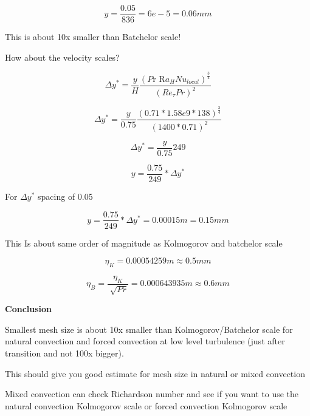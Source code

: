 \documentclass[12pt]{article}
\renewcommand{\_}{\kern-1.5pt\textunderscore\kern-1.5pt}
\begin{document}
 \[ y=\frac{0.05}{836}=6e-5=0.06 mm \] \par

This is about 10x smaller than Batchelor scale!\par

How about the velocity scales?\par

 \[  \Delta y^{\ast}=\frac{y}{H}\frac{ \left( P\text{r R}a_{H}Nu_{local} \right) ^{\frac{3}{4}}}{ \left( Re_{ \tau}Pr \right) ^{2}} \] \par

 \[  \Delta y^{\ast}=\frac{y}{0.75}\frac{ \left( 0.71\ast1.58e9\ast138  \right) ^{\frac{3}{4}}}{ \left( 1400\ast0.71 \right) ^{2}} \] \par

 \[  \Delta y^{\ast}=\frac{y}{0.75}249 \] \par

 \[ y=\frac{0.75}{249}\ast \Delta y^{\ast} \] \par

For  \(  \Delta y^{\ast} \)  spacing of 0.05\par

 \[ y=\frac{0.75}{249}\ast \Delta y^{\ast}=0.00015 m=0.15 mm \] \par

This Is about same order of magnitude as Kolmogorov and batchelor scale\par

 \[  \eta _{K}=0.00054259 m \approx 0.5 mm \] \par

 \[  \eta _{B}=\frac{ \eta _{K}}{\sqrt[]{Pr}}=0.000643935 m \approx 0.6 mm \] \par


\vspace{\baselineskip}
\textbf{Conclusion}\par

Smallest mesh size is about 10x smaller than Kolmogorov/Batchelor scale for natural convection and forced convection at low level turbulence (just after transition and not 100x bigger).\par

This should give you good estimate for mesh size in natural or mixed convection\par


Mixed convection can check Richardson number and see if you want to use the natural convection Kolmogorov scale or forced convection Kolmogorov scale\par
\end{document}
